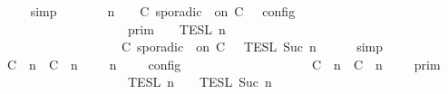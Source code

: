 \begin{isabellebody}
\ \ \ \ \isamarkupfalse%
\ simp\isanewline
\ \ \isamarkupfalse%
\ \isamarkupfalse%
\ {\isacartoucheopen}{\isasymlbrakk}\ {\isasymGamma}{\isacharcomma}\ n\ {\isasymturnstile}\ {\isasymPsi}\ {\isasymtriangleright}\ {\isacharparenleft}{\isacharparenleft}C\ sporadic\ {\isasymtau}\ on\ C\ {\isacharhash}\ {\isasymPhi}{\isacharparenright}\ {\isasymrbrakk}\isactrlsub c\isactrlsub o\isactrlsub n\isactrlsub f\isactrlsub i\isactrlsub g\isanewline
\ \ \ \ \ \ \ \ \ \ \ \ \ \ \ \ \ {\isacharequal}\ \ {\isasymlbrakk}{\isasymlbrakk}\ {\isasymGamma}\ {\isasymrbrakk}{\isasymrbrakk}\isactrlsub p\isactrlsub r\isactrlsub i\isactrlsub m\ {\isasyminter}\ {\isasymlbrakk}{\isasymlbrakk}\ {\isasymPsi}\ {\isasymrbrakk}{\isasymrbrakk}\isactrlsub T\isactrlsub E\isactrlsub S\isactrlsub L\isactrlbsup {\isasymge}\ n\isactrlesup \isanewline
\ \ \ \ \ \ \ \ \ \ \ \ \ \ \ \ \ \ {\isasyminter}\ {\isasymlbrakk}{\isasymlbrakk}\ {\isacharparenleft}C\ sporadic\ {\isasymtau}\ on\ C\ {\isacharhash}\ {\isasymPhi}\ {\isasymrbrakk}{\isasymrbrakk}\isactrlsub T\isactrlsub E\isactrlsub S\isactrlsub L\isactrlbsup {\isasymge}\ Suc\ n\isactrlesup {\isacartoucheclose}\isanewline
\ \ \ \ \isamarkupfalse%
\ simp\isanewline
\ \ \isamarkupfalse%
\ \isamarkupfalse%
\ {\isacartoucheopen}{\isasymlbrakk}\ {\isacharparenleft}{\isacharparenleft}C\ {\isasymUp}\ n{\isacharparenright}\ {\isacharhash}\ {\isacharparenleft}C\ {\isasymDown}\ n\ {\isacharat}\ {\isasymtau}{\isacharparenright}\ {\isacharhash}\ {\isasymGamma}{\isacharparenright}{\isacharcomma}\ n\ {\isasymturnstile}\ {\isasymPsi}\ {\isasymtriangleright}\ {\isasymPhi}\ {\isasymrbrakk}\isactrlsub c\isactrlsub o\isactrlsub n\isactrlsub f\isactrlsub i\isactrlsub g\isanewline
\ \ \ \ \ \ \ \ \ \ \ \ \ \ \ \ \ {\isacharequal}\ \ {\isasymlbrakk}{\isasymlbrakk}\ {\isacharparenleft}{\isacharparenleft}C\ {\isasymUp}\ n{\isacharparenright}\ {\isacharhash}\ {\isacharparenleft}C\ {\isasymDown}\ n\ {\isacharat}\ {\isasymtau}{\isacharparenright}\ {\isacharhash}\ {\isasymGamma}{\isacharparenright}\ {\isasymrbrakk}{\isasymrbrakk}\isactrlsub p\isactrlsub r\isactrlsub i\isactrlsub m\isanewline
\ \ \ \ \ \ \ \ \ \ \ \ \ \ \ \ \ \ {\isasyminter}\ {\isasymlbrakk}{\isasymlbrakk}\ {\isasymPsi}\ {\isasymrbrakk}{\isasymrbrakk}\isactrlsub T\isactrlsub E\isactrlsub S\isactrlsub L\isactrlbsup {\isasymge}\ n\isactrlesup \ {\isasyminter}\ {\isasymlbrakk}{\isasymlbrakk}\ {\isasymPhi}\ {\isasymrbrakk}{\isasymrbrakk}\isactrlsub T\isactrlsub E\isactrlsub S\isactrlsub L\isactrlbsup {\isasymge}\ Suc\ n\isactrlesup {\isacartoucheclose}\isanewline

\end{isabellebody}
